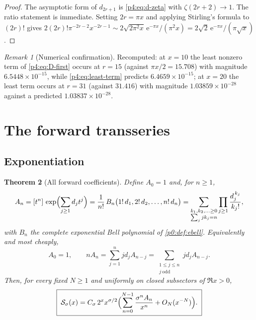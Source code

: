 \documentclass[11pt,a4paper,oneside]{book}
\theoremstyle{plain}
\newtheorem{theorem}{Theorem}[chapter]
\theoremstyle{definition}
\theoremstyle{remark}
\newtheorem{remark}[theorem]{Remark}
\newcommand{\e}{\mathrm{e}}
\newcommand{\Coef}[1]{[#1]\,}
\newcommand{\EB}{B}
\begin{document}
\begin{proof}
The asymptotic form of $d_{2r+1}$ is \cref{p4:eq:d-zeta} with
$\zeta(2r+2)\to1$.  The ratio statement is immediate.  Setting $2r=\pi x$ and
applying Stirling's formula to $(2r)!$ gives
$2(2r)!\pi^{-2r-2}x^{-2r-1}\sim2\sqrt{2\pi^{2}x}\,\e^{-\pi x}/(\pi^{2}x)
=2\sqrt2\,\e^{-\pi x}/(\pi\sqrt x)$.
\end{proof}

\begin{remark}[Numerical confirmation]
\label{p4:rem:leastterm-numeric}
Recomputed: at $x=10$ the least nonzero term of \cref{p4:eq:D-first} occurs at
$r=15$ (against $\pi x/2=15.708$) with magnitude
$6.5448\times10^{-15}$, while \cref{p4:eq:least-term} predicts
$6.4659\times10^{-15}$; at $x=20$ the least term occurs at $r=31$
(against $31.416$) with magnitude $1.03859\times10^{-28}$ against a predicted
$1.03837\times10^{-28}$.
\end{remark}

\section{The forward transseries}
\label{p4:sec:forward}

\subsection{Exponentiation}

\begin{theorem}[All forward coefficients]
\label{p4:thm:forward}
Define $A_0=1$ and, for $n\ge1$,
\begin{equation}
  A_n=\Coef{t^n}\exp\Bigl(\sum_{j\ge1}d_jt^{j}\Bigr)
     =\frac1{n!}\,\EB_n\bigl(1!\,d_1,2!\,d_2,\ldots,n!\,d_n\bigr)
     =\sum_{\substack{k_1,k_2,\ldots\ge0\\ \sum_j jk_j=n}}
       \prod_{j\ge1}\frac{d_j^{\,k_j}}{k_j!},
  \label{p4:eq:A-formulae}
\end{equation}
with $\EB_n$ the complete exponential Bell polynomial of
\cref{p0:def:ebell}.  Equivalently and most cheaply,
\begin{equation}
  A_0=1,\qquad
  nA_n=\sum_{j=1}^{n}jd_jA_{n-j}
      =\sum_{\substack{1\le j\le n\\ j\ \mathrm{odd}}}jd_jA_{n-j}.
  \label{p4:eq:A-recurrence}
\end{equation}
Then, for every fixed $N\ge1$ and uniformly on closed subsectors of
$\Re x>0$,
\begin{equation}
  \boxed{\;
  \mathcal S_\sigma(x)=C_\sigma\,2^{x}x^{\sigma/2}
  \Bigl(\sum_{n=0}^{N-1}\frac{\sigma^{n}A_n}{x^{n}}+O_N(x^{-N})\Bigr).\;}
  \label{p4:eq:forward}
\end{equation}
\end{theorem}
\end{document}
